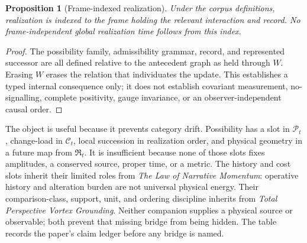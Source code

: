 \documentclass[11pt,a4paper]{article}
\newtheorem{proposition}[definition]{Proposition}
\theoremstyle{remark}
\newcommand{\Rel}{\mathfrak R}
\newcommand{\Poss}{\mathcal P}
\newcommand{\Load}{\mathcal C}
\begin{document}
\begin{proposition}[Frame-indexed realization]\label{prop:relative-realization}
Under the corpus definitions, realization is indexed to the frame holding the
relevant interaction and record. No frame-independent global realization time
follows from this index.
\end{proposition}
\begin{proof}
The possibility family, admissibility grammar, record, and represented
successor are all defined relative to the antecedent graph as held through $W$.
Erasing $W$ erases the relation that individuates the update. This establishes a
typed internal consequence only; it does not establish covariant measurement,
no-signalling, complete positivity, gauge invariance, or an observer-independent
causal order.
\end{proof}

The object is useful because it prevents category drift. Possibility has a slot
in $\Poss_t$, change-load in $\Load_t$, local succession in realization order,
and physical geometry in a future map from $\Rel_t$. It is insufficient because
none of those slots fixes amplitudes, a conserved source, proper time, or a
metric. The history and cost slots inherit their limited roles from
\emph{The Law of Narrative Momentum}: operative history and alteration burden
are not universal physical energy. Their comparison-class, support, unit, and
ordering discipline inherits from \emph{Total Perspective Vortex Grounding}.
Neither companion supplies a physical source or observable; both prevent that
missing bridge from being hidden. The table records the paper's claim ledger
before any bridge is named.
\end{document}
